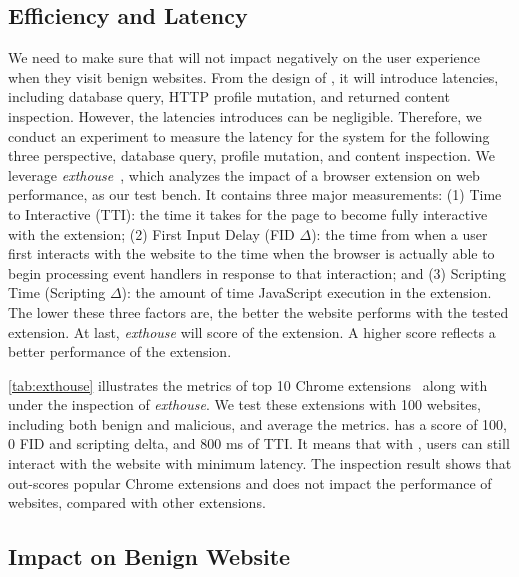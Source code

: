 \subsection{Efficiency and Latency}

We need to make sure that \spartacus will not impact negatively on the user experience when they visit benign websites.
From the design of \spartacus, it will introduce latencies, including database query, HTTP profile mutation, and returned content inspection.
However, the latencies \spartacus introduces can be negligible.
Therefore, we conduct an experiment to measure the latency for the \spartacus system for the following three perspective, database query, profile mutation, and content inspection.
We leverage \emph{exthouse}~\cite{exthouse}, which analyzes the impact of a browser extension on web performance, as our test bench.
It contains three major measurements:
(1) Time to Interactive (TTI): the time it takes for the page to become fully interactive with the extension; 
(2) First Input Delay (FID $\Delta$): the time from when a user first interacts with the website to the time when the browser is actually able to begin processing event handlers in response to that interaction;
and (3) Scripting Time (Scripting $\Delta$): the amount of time JavaScript execution in the extension.
The lower these three factors are, the better the website performs with the tested extension.
At last, \emph{exthouse} will score of the extension.
A higher score reflects a better performance of the extension.

\exthouse

\autoref{tab:exthouse} illustrates the metrics of top 10 Chrome extensions~\cite{exthouse} along with \spartacus under the inspection of \emph{exthouse}.
We test these extensions with 100 websites, including both benign and malicious, and average the metrics.
\spartacus has a score of 100, 0 FID and scripting delta, and 800 ms of TTI.
It means that with \spartacus, users can still interact with the website with minimum latency.
The inspection result shows that \spartacus out-scores popular Chrome extensions and does not impact the performance of websites, compared with other extensions.

\subsection{Impact on Benign Website}

